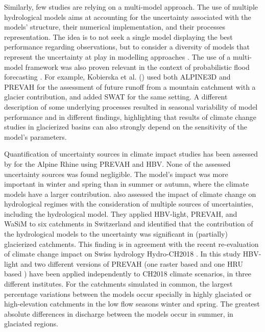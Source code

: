 \documentclass[10pt,a4paper]{article}
\begin{document}
Similarly, few studies are relying on a multi-model approach. The use of multiple hydrological models aims at accounting for the uncertainty associated with the models' structure, their numerical implementation, and their processes representation. The idea is to not seek a single model displaying the best performance regarding observations, but to consider a diversity of models that represent the uncertainty at play in modelling approaches \citep{Babel2019}. The use of a multi-model framework was also proven relevant in the context of probabilistic flood forecasting \citep{Kauffeldt2016}. For example, Kobierska et al. (\citeyear{Kobierska2011, Kobierska2013}) used both ALPINE3D and PREVAH for the assessment of future runoff from a mountain catchment with a glacier contribution, and \citet{Andrianaki2019} added SWAT for the same setting. A different description of some underlying processes resulted in seasonal variability of model performance and in different findings, highlighting that results of climate change studies in glacierized basins can also strongly depend on the sensitivity of the model's parameters. 

Quantification of uncertainty sources in climate impact studies has been assessed by \citet{Bosshard2013a} for the Alpine Rhine using PREVAH and HBV. None of the assessed uncertainty sources was found negligible. The model's impact was more important in winter and spring than in summer or autumn, where the climate models have a larger contribution. \citet{Addor2014} also assessed the impact of climate change on hydrological regimes with the consideration of multiple sources of uncertainties, including the hydrological model. They applied HBV-light, PREVAH, and WaSiM to six catchments in Switzerland and identified that the contribution of the hydrological models to the uncertainty was significant in (partially) glacierized catchments. This finding is in agreement with the recent re-evaluation of climate change impact on Swiss hydrology Hydro-CH2018 \citep{FOEN2021}. In this study  HBV-light and two different versions of PREVAH (one raster based \citep{Speich2015}  and one HRU based \citep{Viviroli2009a}) have been applied independently to CH2018 climate scenarios, in three different institutes. For the catchments simulated in common, the largest percentage variations between the models occur specially in highly glaciated or high-elevation catchments in the low flow seasons winter and spring. The greatest absolute differences in discharge between the models occur in summer, in glaciated regions.
\end{document}
